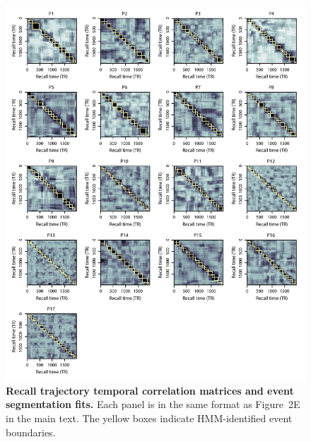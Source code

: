 \documentclass{article}
\begin{document}
\begin{figure}[p!]
\centering
\includegraphics[width=\textwidth]{figs/corrmats}
\caption{\small \textbf{Recall trajectory temporal correlation matrices and event segmentation fits.} Each panel is in the same format as Figure~2E in the main text.  The yellow boxes indicate HMM-identified event boundaries.}
\label{fig:corrmats}
\end{figure}
\end{document}
